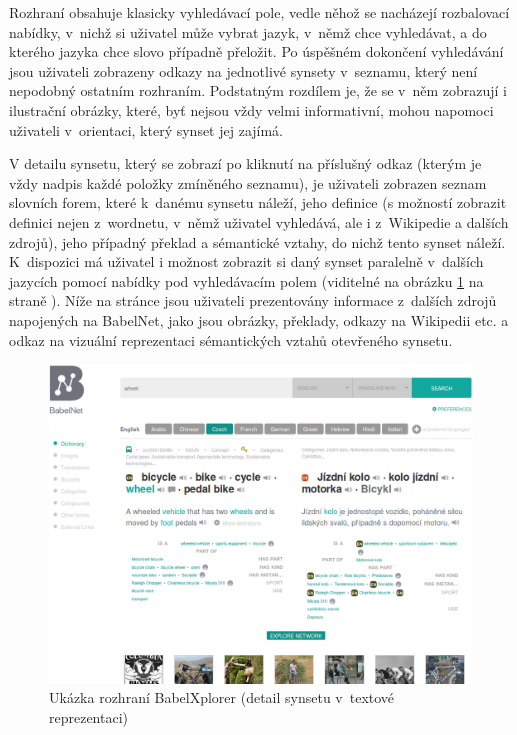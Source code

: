 \documentclass[a4paper, 11pt, oneside, showtrims]{book}
\begin{document}
					Rozhraní obsahuje klasicky vyhledávací pole, vedle něhož se nacházejí rozbalovací nabídky, v~nichž si uživatel může vybrat jazyk, v~němž chce vyhledávat, a do kterého jazyka chce slovo případně přeložit. Po úspěšném dokončení vyhledávání jsou uživateli zobrazeny odkazy na jednotlivé synsety v~seznamu, který není nepodobný ostatním rozhraním. Podstatným rozdílem je, že se v~něm zobrazují i ilustrační obrázky, které, byť nejsou vždy velmi informativní, mohou napomoci uživateli v~orientaci, který synset jej zajímá. 

					V detailu synsetu, který se zobrazí po kliknutí na příslušný odkaz (kterým je vždy nadpis každé položky zmíněného seznamu), je uživateli zobrazen seznam slovních forem, které k~danému synsetu náleží, jeho definice (s možností zobrazit definici nejen z~wordnetu, v~němž uživatel vyhledává, ale i z~Wikipedie a dalších zdrojů), jeho případný překlad a sémantické vztahy, do nichž tento synset náleží. K~dispozici má uživatel i možnost zobrazit si daný synset paralelně v~dalších jazycích pomocí nabídky pod vyhledávacím polem (viditelné na obrázku \ref{fig:babelxplorer} na straně \pageref{fig:babelxplorer}). Níže na stránce jsou uživateli prezentovány informace z~dalších zdrojů napojených na BabelNet, jako jsou obrázky, překlady, odkazy na Wikipedii etc. a odkaz na vizuální reprezentaci sémantických vztahů otevřeného synsetu. 

					\begin{figure}[h]
						\centering
						\includegraphics[width=1.0\textwidth]{babelxplorer.png}
						\caption{Ukázka rozhraní BabelXplorer (detail synsetu v~textové reprezentaci)}
						\label{fig:babelxplorer}
					\end{figure}
\end{document}
